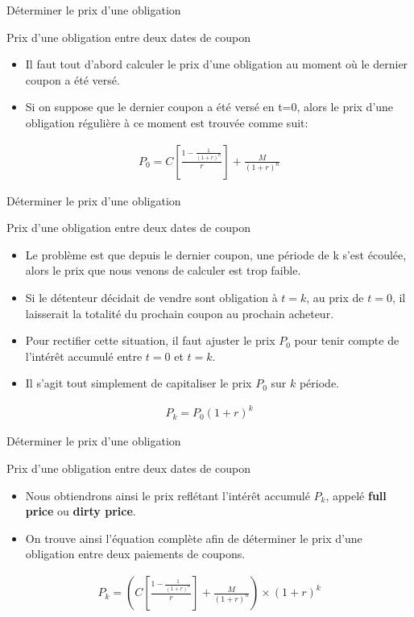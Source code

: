 \documentclass{beamer}
\begin{document}
\begin{frame}{Déterminer le prix d'une obligation}
\begin{block}{Prix d'une obligation entre deux dates de coupon}
\begin{itemize}
\item Il faut tout d'abord calculer le prix d'une obligation au moment où le dernier coupon a été versé. 
\item Si on suppose que le dernier coupon a été versé en t=0, alors le prix d'une obligation régulière à ce moment est trouvée comme suit:
\end{itemize}
\begin{align*}
P_0=C \left[ \frac{1-\frac{1}{(1+r)^n}}{r} \right]+\frac{M}{(1+r)^n}
\end{align*}
\end{block}
\end{frame}

\begin{frame}{Déterminer le prix d'une obligation}
\begin{block}{Prix d'une obligation entre deux dates de coupon}
\begin{itemize}
\item Le problème est que depuis le dernier coupon, une période de k s'est écoulée, alors le prix que nous venons de calculer est trop faible. 
\item Si le détenteur décidait de vendre sont obligation à $t= k$, au prix de $t=0$, il laisserait la totalité du prochain coupon au prochain acheteur.
\item Pour rectifier cette situation, il faut ajuster le prix $P_0$ pour tenir compte de l'intérêt accumulé entre $t=0$ et $t=k$. 
\item Il s'agit tout simplement de capitaliser le prix $P_0$ sur $k$ période. 
\end{itemize}
\begin{align*}
P_k=P_0 (1+r)^k
\end{align*}
\end{block}
\end{frame}

\begin{frame}{Déterminer le prix d'une obligation}
\begin{block}{Prix d'une obligation entre deux dates de coupon}
\begin{itemize}
\item Nous obtiendrons ainsi le prix reflétant l'intérêt accumulé $P_k$, appelé \textbf{full price} ou \textbf{dirty price}. 
\item On trouve ainsi l'équation complète afin de déterminer le prix d'une obligation entre deux paiements de coupons.
\end{itemize}
\begin{align*}
P_k= \left( C \left[ \frac{1-\frac{1}{(1+r)^n}}{r} \right]+\frac{M}{(1+r)^n} \right) \times (1+r)^k
\end{align*}
\end{block}
\end{frame}
\end{document}
